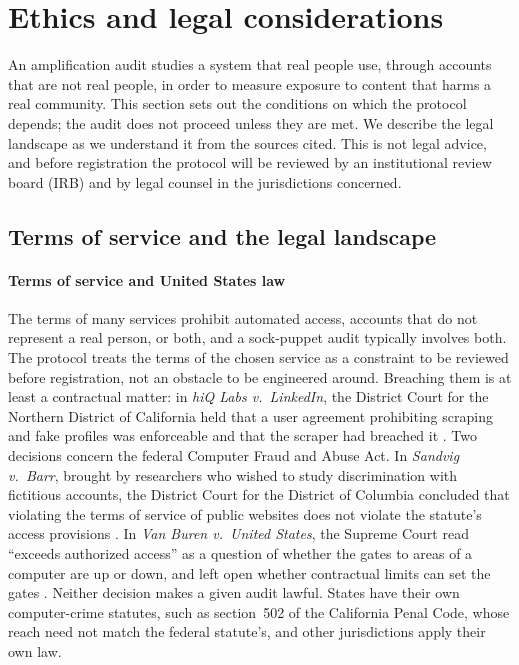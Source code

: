 \section{Ethics and legal considerations}\label{sec:ethics}

An amplification audit studies a system that real people use, through accounts that are not real people, in order to measure exposure to content that harms a real community. This section sets out the conditions on which the protocol depends; the audit does not proceed unless they are met. We describe the legal landscape as we understand it from the sources cited. This is not legal advice, and before registration the protocol will be reviewed by an institutional review board (IRB) and by legal counsel in the jurisdictions concerned.

\subsection{Terms of service and the legal landscape}\label{sec:eth-legal}

\paragraph{Terms of service and United States law}
The terms of many services prohibit automated access, accounts that do not represent a real person, or both, and a sock-puppet audit typically involves both. The protocol treats the terms of the chosen service as a constraint to be reviewed before registration, not an obstacle to be engineered around. Breaching them is at least a contractual matter: in \emph{hiQ Labs v.\ LinkedIn}, the District Court for the Northern District of California held that a user agreement prohibiting scraping and fake profiles was enforceable and that the scraper had breached it \citep{hiq2022}. Two decisions concern the federal Computer Fraud and Abuse Act. In \emph{Sandvig v.\ Barr}, brought by researchers who wished to study discrimination with fictitious accounts, the District Court for the District of Columbia concluded that violating the terms of service of public websites does not violate the statute's access provisions \citep{sandvigbarr2020}. In \emph{Van Buren v.\ United States}, the Supreme Court read ``exceeds authorized access'' as a question of whether the gates to areas of a computer are up or down, and left open whether contractual limits can set the gates \citep{vanburen2021}. Neither decision makes a given audit lawful. States have their own computer-crime statutes, such as section~502 of the California Penal Code, whose reach need not match the federal statute's, and other jurisdictions apply their own law.


